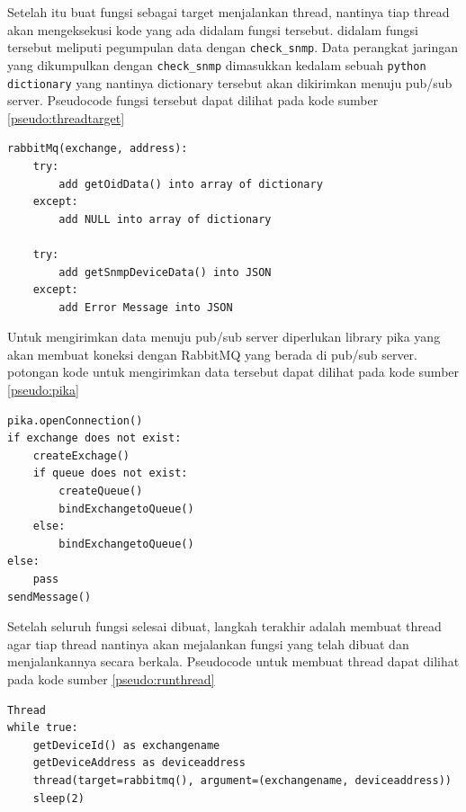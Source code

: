     			Setelah itu buat fungsi sebagai target menjalankan thread, nantinya tiap thread akan mengeksekusi kode yang ada didalam fungsi tersebut. didalam fungsi tersebut meliputi pegumpulan data dengan \texttt{check\_snmp}. Data perangkat jaringan yang dikumpulkan dengan \texttt{check\_snmp} dimasukkan kedalam sebuah \texttt{python dictionary} yang nantinya dictionary tersebut akan dikirimkan menuju pub/sub server. Pseudocode fungsi tersebut dapat dilihat pada kode sumber \ref{pseudo:threadtarget}
    			
\begin{lstlisting}[frame=single,breaklines,caption={Pseudocode Target \textit{Thread} Untuk Mengambil Data Perangkat},label=pseudo:threadtarget, captionpos=b]
rabbitMq(exchange, address):
	try:
		add getOidData() into array of dictionary
	except:
		add NULL into array of dictionary
	
	try:
		add getSnmpDeviceData() into JSON
	except:
		add Error Message into JSON		
\end{lstlisting}
    			
    			Untuk mengirimkan data menuju pub/sub server diperlukan library pika yang akan membuat koneksi dengan RabbitMQ yang berada di pub/sub server. potongan kode untuk mengirimkan data tersebut dapat dilihat pada kode sumber \ref{pseudo:pika}
    			
\begin{lstlisting}[frame=single,breaklines,caption={Pseudocode Pengiriman Data Dengan Pika},label=pseudo:pika, captionpos=b]
pika.openConnection()
if exchange does not exist:
	createExchage()
	if queue does not exist:
		createQueue()
		bindExchangetoQueue()
	else:
		bindExchangetoQueue()
else:
	pass
sendMessage()
\end{lstlisting}
    			
				Setelah seluruh fungsi selesai dibuat, langkah terakhir adalah membuat thread agar tiap thread nantinya akan mejalankan fungsi yang telah dibuat dan menjalankannya secara berkala. Pseudocode untuk membuat thread dapat dilihat pada kode sumber \ref{pseudo:runthread}
				
\begin{lstlisting}[frame=single,breaklines,caption={Pseudocode Menjalankan Thread},label=pseudo:runthread, captionpos=b]
Thread
while true:
	getDeviceId() as exchangename
	getDeviceAddress as deviceaddress
	thread(target=rabbitmq(), argument=(exchangename, deviceaddress))
	sleep(2)

\end{lstlisting}

